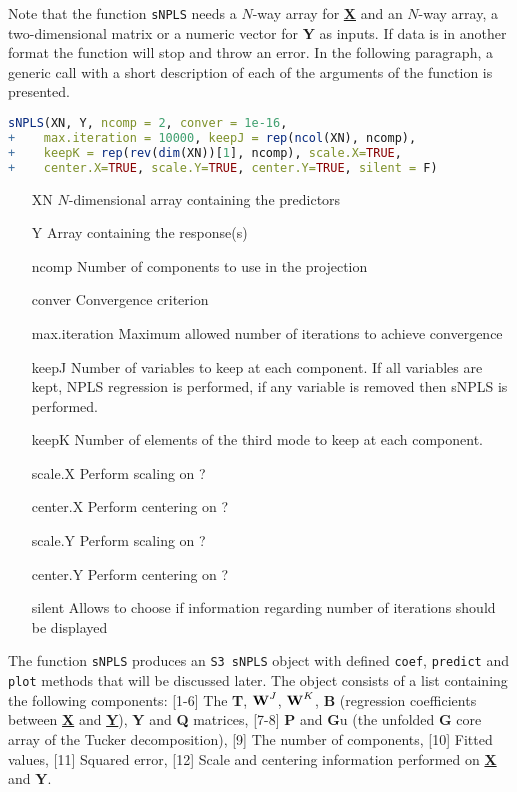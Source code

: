 Note that the function \texttt{sNPLS} needs a $N$-way array for \textbf{\underline{X}} and an $N$-way array, a two-dimensional matrix or a numeric vector for \textbf{Y} as inputs. If data is in another format the function will stop and throw an error. In the following paragraph, a generic call with a short description of each of the arguments of the function is presented.
\vspace{15pt}
\begin{lstlisting}[basicstyle=\small, language=R, deletekeywords={max, scale}, morekeywords={array, matrix, rep, rpois, rnorm, function}, otherkeywords={}]
sNPLS(XN, Y, ncomp = 2, conver = 1e-16, 
+    max.iteration = 10000, keepJ = rep(ncol(XN), ncomp), 
+    keepK = rep(rev(dim(XN))[1], ncomp), scale.X=TRUE, 
+    center.X=TRUE, scale.Y=TRUE, center.Y=TRUE, silent = F)
\end{lstlisting}
\vspace{10pt}
\begin{itemize}[leftmargin=2.5cm]
\item[XN] $N$-dimensional array containing the predictors
\item[Y] Array containing the response(s)
\item[ncomp] Number of components to use in the projection
\item[conver] Convergence criterion
\item[max.iteration] Maximum allowed number of iterations to achieve convergence
\item[keepJ] Number of variables to keep at each component. If all variables are kept, NPLS regression is performed, if any variable is removed then sNPLS is performed.
\item[keepK] Number of elements of the third mode to keep at each component.
\item[scale.X] Perform scaling on \textbf{}?
\item[center.X] Perform centering on \textbf{}?
\item[scale.Y] Perform scaling on \textbf{}?
\item[center.Y] Perform centering on \textbf{}?
\item[silent] Allows to choose if information regarding number of iterations should be displayed
\end{itemize}
\vspace{7pt}
The function \texttt{sNPLS} produces an \texttt{S3 sNPLS} object with defined \texttt{coef}, \texttt{predict} and \texttt{plot} methods that will be discussed later. The object consists of a list containing the following components: [1-6] The \textbf{T}, $\textbf{\text{W}}^{J}$, $\textbf{\text{W}}^{K}$, \textbf{B} (regression coefficients between \textbf{\underline{X}} and \textbf{\underline{Y}}), \textbf{Y} and \textbf{Q} matrices, [7-8] \textbf{P} and \textbf{G}u (the unfolded \textbf{G} core array of the Tucker decomposition), [9] The number of components, [10] Fitted values, [11] Squared error, [12] Scale and centering information performed on \textbf{\underline{X}} and \textbf{Y}.

